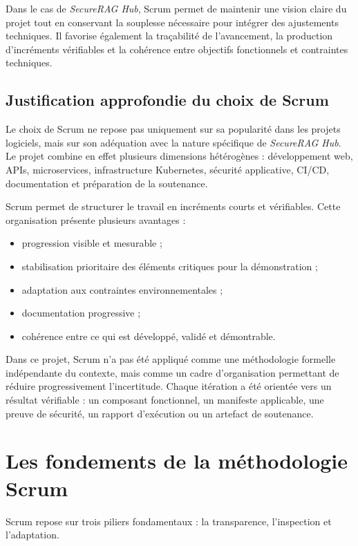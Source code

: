 Dans le cas de \textit{SecureRAG Hub}, Scrum permet de maintenir une vision claire du projet tout en conservant la souplesse nécessaire pour intégrer des ajustements techniques. Il favorise également la traçabilité de l’avancement, la production d’incréments vérifiables et la cohérence entre objectifs fonctionnels et contraintes techniques.

\subsection{Justification approfondie du choix de Scrum}

Le choix de Scrum ne repose pas uniquement sur sa popularité dans les projets logiciels, mais sur son adéquation avec la nature spécifique de \textit{SecureRAG Hub}. Le projet combine en effet plusieurs dimensions hétérogènes : développement web, APIs, microservices, infrastructure Kubernetes, sécurité applicative, CI/CD, documentation et préparation de la soutenance.

Scrum permet de structurer le travail en incréments courts et vérifiables. Cette organisation présente plusieurs avantages :

\begin{itemize}
    \item progression visible et mesurable ;
    \item stabilisation prioritaire des éléments critiques pour la démonstration ;
    \item adaptation aux contraintes environnementales ;
    \item documentation progressive ;
    \item cohérence entre ce qui est développé, validé et démontrable.
\end{itemize}

Dans ce projet, Scrum n'a pas été appliqué comme une méthodologie formelle indépendante du contexte, mais comme un cadre d’organisation permettant de réduire progressivement l’incertitude. Chaque itération a été orientée vers un résultat vérifiable : un composant fonctionnel, un manifeste applicable, une preuve de sécurité, un rapport d’exécution ou un artefact de soutenance.

\section{Les fondements de la méthodologie Scrum}

Scrum repose sur trois piliers fondamentaux : la transparence, l’inspection et l’adaptation.

